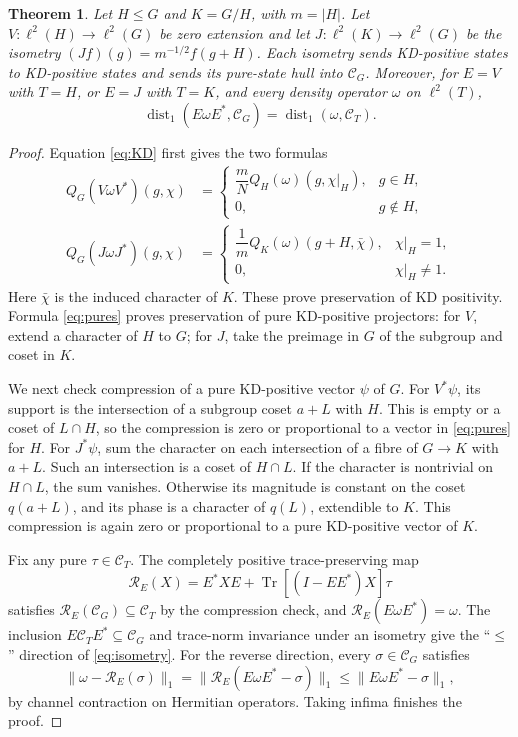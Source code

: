 \documentclass[11pt,a4paper]{article}
\newtheorem{theorem}{Theorem}
\theoremstyle{definition}
\theoremstyle{plain}
\newenvironment{statementframe}{%
  \par\addvspace{0.55\baselineskip}\noindent
  \begingroup\setlength{\fboxrule}{0.3pt}\setlength{\fboxsep}{7pt}%
  \begin{lrbox}{\statementbox}%
  \begin{minipage}{\dimexpr\linewidth-2\fboxsep-2\fboxrule\relax}%
}{%
  \end{minipage}\end{lrbox}%
  {\color{black!45}\fbox{\color{black}\usebox{\statementbox}}}%
  \endgroup\par\addvspace{0.45\baselineskip}%
}
\DeclareMathOperator{\Tr}{Tr}
\DeclareMathOperator{\dist}{dist}
\newcommand{\hull}{\mathcal C}
\begin{document}
\begin{statementframe}
\begin{theorem}\label{thm:lift}
Let $H\leq G$ and $K=G/H$, with $m=|H|$. Let $V:\ell^2(H)\to\ell^2(G)$
be zero extension and let $J:\ell^2(K)\to\ell^2(G)$ be the isometry
$(Jf)(g)=m^{-1/2}f(g+H)$. Each isometry sends KD-positive states to
KD-positive states and sends its pure-state hull into $\hull_G$.
Moreover, for $E=V$ with $T=H$, or $E=J$ with $T=K$, and every density
operator $\omega$ on $\ell^2(T)$,
\begin{equation}\label{eq:isometry}
 \dist_1(E\omega E^*,\hull_G)=\dist_1(\omega,\hull_T).
\end{equation}
\end{theorem}
\end{statementframe}

\begin{proof}
Equation \eqref{eq:KD} first gives the two formulas
\begin{align}
 Q_G(V\omega V^*)(g,\chi)
 &=\begin{cases}\dfrac mN Q_H(\omega)(g,\chi|_H),&g\in H,\\0,&g\notin H,
 \end{cases}\label{eq:subgroup}\\
 Q_G(J\omega J^*)(g,\chi)
 &=\begin{cases}\dfrac1m Q_K(\omega)(g+H,\bar\chi),&\chi|_H=1,\\0,&\chi|_H\ne1.
 \end{cases}\label{eq:quotient}
\end{align}
Here $\bar\chi$ is the induced character of $K$. These prove preservation
of KD positivity. Formula \eqref{eq:pures} proves preservation of pure
KD-positive projectors: for $V$, extend a character of $H$ to $G$; for
$J$, take the preimage in $G$ of the subgroup and coset in $K$.

We next check compression of a pure KD-positive vector $\psi$ of $G$.
For $V^*\psi$, its support is the intersection of a subgroup coset
$a+L$ with $H$. This is empty or a coset of $L\cap H$, so the compression
is zero or proportional to a vector in \eqref{eq:pures} for $H$.
For $J^*\psi$, sum the character on each intersection of a fibre of
$G\to K$ with $a+L$. Such an intersection is a coset of $H\cap L$.
If the character is nontrivial on $H\cap L$, the sum vanishes.
Otherwise its magnitude is constant on the coset $q(a+L)$, and its phase
is a character of $q(L)$, extendible to $K$. This compression is again
zero or proportional to a pure KD-positive vector of $K$.

Fix any pure $\tau\in\hull_T$. The completely positive trace-preserving map
\[
 \mathcal R_E(X)=E^*XE+\Tr[(I-EE^*)X]\tau
\]
satisfies $\mathcal R_E(\hull_G)\subseteq\hull_T$ by the compression check,
and $\mathcal R_E(E\omega E^*)=\omega$. The inclusion
$E\hull_TE^*\subseteq\hull_G$ and trace-norm invariance under an isometry
give the ``$\leq$'' direction of \eqref{eq:isometry}. For the reverse
direction, every $\sigma\in\hull_G$ satisfies
\[
 \|\omega-\mathcal R_E(\sigma)\|_1
 =\|\mathcal R_E(E\omega E^*-\sigma)\|_1
 \leq\|E\omega E^*-\sigma\|_1,
\]
by channel contraction on Hermitian operators. Taking infima finishes
the proof.
\end{proof}
\end{document}
